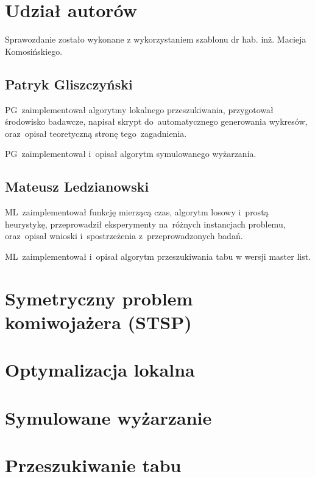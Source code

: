 \documentclass{article}
\begin{document}
\sloppy
{}



\section*{Udział autorów}

Sprawozdanie zostało wykonane z wykorzystaniem szablonu dr hab. inż. Macieja Komosińskiego. \cite{MiOIB}

\subsection*{Patryk Gliszczyński}
PG~zaimplementował algorytmy lokalnego przeszukiwania, przygotował środowisko badawcze, napisał skrypt do~automatycznego generowania wykresów, oraz~opisał teoretyczną stronę tego~zagadnienia.

PG~zaimplementował i~opisał algorytm symulowanego wyżarzania.

\subsection*{Mateusz Ledzianowski}
ML~zaimplementował funkcję mierzącą czas, algorytm losowy i~prostą heurystykę, przeprowadził eksperymenty na~różnych instancjach problemu, oraz~opisał wnioski i~spostrzeżenia z~przeprowadzonych badań.

ML~zaimplementował i~opisał algorytm przeszukiwania tabu w wersji master list.

\clearpage

\section{Symetryczny problem komiwojażera (STSP)}


\clearpage

\section{Optymalizacja lokalna}


\clearpage
{\color{part2}
\section{Symulowane wyżarzanie}


\clearpage

\section{Przeszukiwanie tabu}

}
\clearpage
\end{document}
